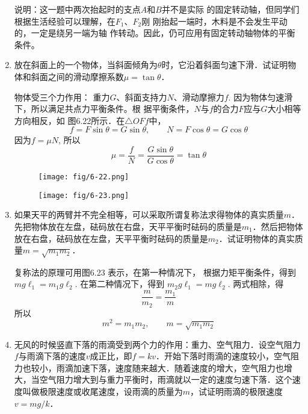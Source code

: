 \begin{enumerate}
\begin{solution}
说明：这一题中两次抬起时的支点$A$和$B$并不是实际
的固定转动轴，但同学们根据生活经验可以理解，在$F_1$、$F_2$刚
刚抬起一端时，木料是不会发生平动的，一定是绕另一端为轴
作转动。因此，仍可应用有固定转动轴物体的平衡条件。

\end{solution}
\item 放在斜面上的一个物体，当斜面倾角为$\theta$时，它沿着斜面匀速下滑．试证明物体和斜面之间的滑动摩擦系数$\mu=\tan \theta$．

\begin{solution}
物体受三个力作用：
重力$G$、斜面支持力$N$、滑动摩擦力$f$. 因为物体匀速滑下，所以满足共点力平衡条件。根
据平衡条件，$N$与$f$的合力$F$应与$G$大小相等方向相反，如
图6.22所示．在$\triangle OFf$中，
\[f=F\sin\theta =G\sin \theta,\qquad N=F\cos\theta=G\cos\theta\]
因为$f=\mu N$, 所以
\[\mu =\frac{f}{N}=\frac{G\sin \theta}{G\cos \theta}=\tan\theta\]
\end{solution}

\begin{figure}[htp]\centering
    \begin{minipage}[t]{0.48\textwidth}
    \centering
\texttt{[image: fig/6-22.png]}
    \caption{}
    \end{minipage}
    \begin{minipage}[t]{0.48\textwidth}
    \centering
\texttt{[image: fig/6-23.png]}
    \caption{}
    \end{minipage}
    \end{figure}

\item 如果天平的两臂并不完全相等，可以采取所谓复称法求得物体的真实质量$m$．先把物体放在左盘，砝码放在右盘，天平平衡时砝码的质量是$m_1$．然后把物体放在右盘，砝码放在左盘，天平平衡时砝码的质量是$m_2$．试证明物体的真实质量$m=\sqrt{m_1m_2}$．

\begin{solution}
    复称法的原理可用图6.23 表示，在第一种情况下，
    根据力矩平衡条件，得到$mg\ell_1=m_1g\ell_2$. 在第二种情况下，得到 $m_2g\ell_1=mg\ell_2$. 两式相除，得
\[\frac{m}{m_2}=\frac{m_1}{m}\]
所以
\[m^2=m_1m_2,\qquad m=\sqrt{m_1m_2}\]
\end{solution}
\item 无风的时候竖直下落的雨滴受到两个力的作用：重力、空气阻力．设空气阻力$f$与雨滴下落的速度$v$成正比，即$f=kv$．开始下落时雨滴的速度较小，空气阻力也较小，雨滴加速下落，速度随来越大．随着速度的增大，空气阻力也增大，当空气阻力增大到与重力平衡时，雨滴就以一定的速度匀速下落．这个速度叫做极限速度或收尾速度，设雨滴的质量为$m$，试证明雨滴的极限速度$v=mg/k$．



\end{enumerate}
